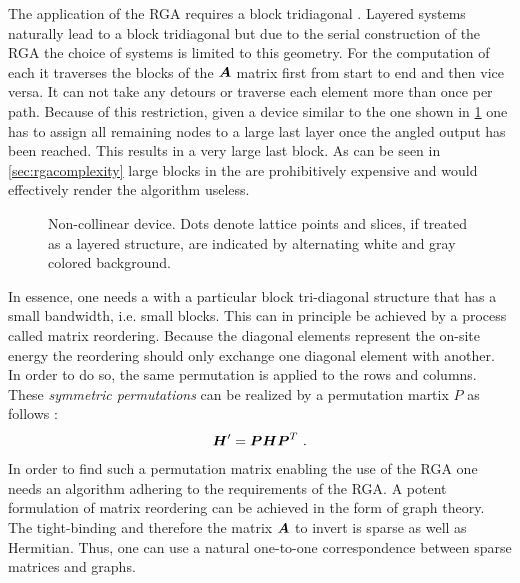 The application of the RGA requires a block tridiagonal \hamil{}. Layered systems naturally lead to a block tridiagonal \hamil{} but due to the serial construction of the RGA the choice of systems is limited to this geometry. For the computation of each \gfnc{} it traverses the blocks of the $\boldsymbol{A}$ matrix first from start to end and then vice versa. It can not take any detours or traverse each element more than once per path. Because of this restriction, given a device similar to the one shown in \cref{fig:noncollinear} one has to assign all remaining nodes to a large last layer once the angled output has been reached. This results in a very large last block. As can be seen in \cref{sec:rgacomplexity} large blocks in the \hamil{} are prohibitively expensive and would effectively render the algorithm useless.
\begin{figure}[!ht]
\centering
{}
\caption{Non-collinear device. Dots denote lattice points and slices, if treated as a layered structure, are indicated by alternating white and gray colored background.}
\label{fig:noncollinear}
\end{figure}
In essence, one needs a \hamil{} with a particular block tri-diagonal structure that has a small bandwidth, i.e. small blocks. This can in principle be achieved by a process called matrix reordering. Because the diagonal elements represent the on-site energy the reordering should only exchange one diagonal element with another. In order to do so, the same permutation is applied to the rows and columns. These \emph{symmetric permutations} can be realized by a permutation martix $P$ as follows \cite{saad2003iterative}:
\begin{align}
\boldsymbol{H}' = \boldsymbol{P} \boldsymbol{H} \boldsymbol{P}^{T}\ .
\label{eqn:permutation}
\end{align}
In order to find such a permutation matrix enabling the use of the RGA one needs an algorithm adhering to the requirements of the RGA.
A potent formulation of matrix reordering can be achieved in the form of graph theory. The tight-binding \hamil{} and therefore the matrix $\boldsymbol{A}$ to invert is sparse as well as Hermitian. Thus, one can use a natural one-to-one correspondence between sparse matrices and graphs.
